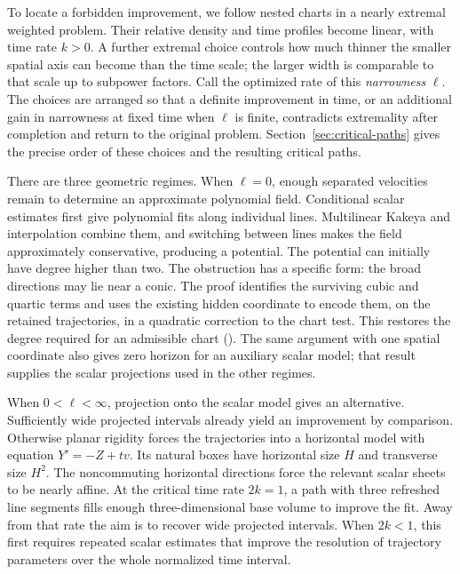 To locate a forbidden improvement, we follow nested charts in a
nearly extremal weighted problem. Their relative density and time
profiles become linear, with time rate \(k>0\).
A further extremal choice controls how much thinner the smaller
spatial axis can become than the time scale; the larger width is
comparable to that scale up to subpower factors.
Call the optimized rate of this \emph{narrowness} \(\ell\).
The choices are arranged so that a definite improvement in time,
or an additional gain in narrowness at fixed time when \(\ell\)
is finite, contradicts extremality after completion and return to
the original problem. Section~\ref{sec:critical-paths} gives the
precise order of these choices and the resulting critical paths.

There are three geometric regimes. When \(\ell=0\), enough
separated velocities remain to determine an approximate polynomial
field. Conditional scalar estimates first give polynomial fits
along individual lines. Multilinear Kakeya and interpolation combine
them, and switching between lines makes the field approximately
conservative, producing a potential.
The potential can initially have degree higher than two. The
obstruction has a specific form: the broad directions may lie near
a conic. The proof identifies the surviving cubic and quartic terms
and uses the existing hidden coordinate to encode them, on the
retained trajectories, in a quadratic correction to the chart test.
This restores the degree required for an admissible chart
().
The same argument with one spatial coordinate also gives zero
horizon for an auxiliary scalar model; that result supplies the
scalar projections used in the other regimes.

When \(0<\ell<\infty\), projection onto the scalar model gives an
alternative. Sufficiently wide projected intervals already yield an
improvement by comparison. Otherwise planar rigidity forces the
trajectories into a horizontal model with equation \(Y'=-Z+tv\).
Its natural boxes have horizontal size \(H\) and transverse size
\(H^2\). The noncommuting horizontal directions force the relevant
scalar sheets to be nearly affine.
At the critical time rate \(2k=1\), a path with three refreshed
line segments fills enough three-dimensional base volume to improve
the fit. Away from that rate the aim is to recover wide projected
intervals. When \(2k<1\), this first requires repeated scalar
estimates that improve the resolution of trajectory parameters over
the whole normalized time interval.

